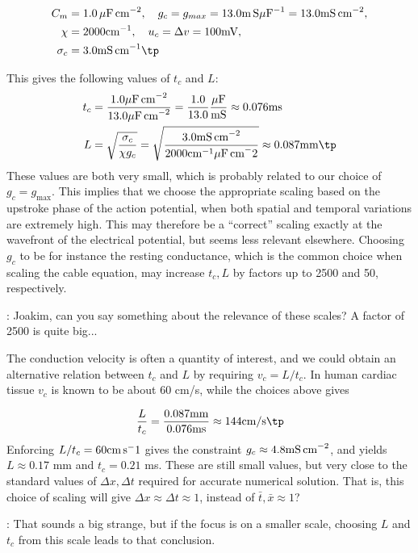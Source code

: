 \documentclass[graybox,envcountchap,sectrefs,final]{svmonodo}
\newcommand{\shortinlinecomment}[3]{{\color{red}{\bf #1}: #2}}
\newcommand{\longinlinecomment}[3]{{\color{red}{\bf #1}: #2}}
\begin{document}
\begin{align*}
C_m &= 1.0\, \mu\hbox{F\,cm}^{-2}, \quad g_c = g_{max} = 13.0
\hbox{m\,S}\mu\hbox{F}^{-1} = 13.0 \hbox{mS\,cm}^{-2}, \\ 
\chi &= 2000 \hbox{cm}^{-1} , \quad u_c = \Delta v = 100 \hbox{mV} , \\ 
\sigma_c &= 3.0 \hbox{mS\,cm}^{-1}\tp
\end{align*}

This gives the following values of $t_c$ and $L$:
\begin{align*} t_c &= \frac{1.0 \mu\hbox{F\,cm}^{-2}}{13.0 \mu\hbox{F\,cm}^{-2}} =
\frac{1.0}{13.0}\frac{\mu\hbox{F}}{\hbox{mS}} \approx 0.076 \hbox{ms} \\ 
L &= \sqrt{\frac{\sigma_c}{\chi g_c}} = \sqrt{\frac{3.0
\hbox{mS\,cm}^{-2}}{2000\hbox{cm}^{-1} \mu\hbox{F\,cm}^-2}}
\approx 0.087 \hbox{mm} \tp
\end{align*}
These values are both very small, which is probably related to our
choice of $g_c = g_{\max}$. This implies that we choose the appropriate
scaling based on the upstroke phase of the action potential, when both
spatial and temporal variations are extremely high. This may therefore
be a ``correct'' scaling exactly at the wavefront of the electrical
potential, but seems less relevant elsewhere. Choosing $g_c$ to be for
instance the resting conductance, which is the common choice when
scaling the cable equation, may increase $t_c, L$ by factors up to 2500 and
50, respectively.

\shortinlinecomment{hpl 23}{ Joakim, can you say something about the relevance of these scales? A factor of 2500 is quite big... }{ Joakim, can you say }

The conduction velocity is often a quantity of interest, and we could
obtain an alternative relation between $t_c$ and $L$ by requiring
$v_{c} = L/t_c$. In human cardiac tissue $v_c$ is known to be about
60 cm/s, while the choices above gives

\[
\frac{L}{t_c} =  \frac{0.087\rm{mm}}{0.076\rm{ms}} \approx 144
\hbox{cm/s}\tp \]
Enforcing $L/t_c = 60 \hbox{cm\,s}^-1$ gives the constraint $g_c \approx
4.8 \hbox{mS\,cm}^{-2}$, and yields $L \approx 0.17$ mm and
$t_c=0.21$ ms. These are still small values, but very close to the
standard values of $\Delta x, \Delta t$ required for accurate
numerical solution. That is, this choice of scaling will give $\Delta x
\approx \Delta t \approx 1$, instead of $\bar t, \bar x \approx 1$?

\longinlinecomment{hpl 24}{ That sounds a big strange, but if the focus is on a smaller scale, choosing $L$ and $t_c$ from this scale leads to that conclusion. }{ That sounds a big }
\end{document}
